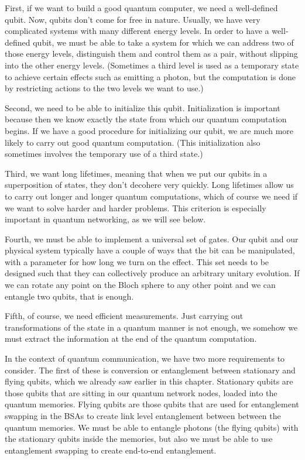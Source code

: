 First, if we want to build a good quantum computer, we need a well-defined qubit. Now, qubits don't come for free in nature. Usually, we have very complicated systems with many different energy levels. In order to have a well-defined qubit, we must be able to take a system for which we can address two of those energy levels, distinguish them and control them as a pair, without slipping into the other energy levels.  (Sometimes a third level is used as a temporary state to achieve certain effects such as emitting a photon, but the computation is done by restricting actions to the two levels we want to use.)

Second, we need to be able to initialize this qubit. Initialization is important because then we know exactly the state from which our quantum computation begins. If we have a good procedure for initializing our qubit, we are much more likely to carry out good quantum computation.  (This initialization also sometimes involves the temporary use of a third state.)

Third, we want long lifetimes, meaning that when we put our qubits in a superposition of states, they don't decohere very quickly. Long lifetimes allow us to carry out longer and longer quantum computations, which of course we need if we want to solve harder and harder problems.  This criterion is especially important in quantum networking, as we will see below.

Fourth, we must be able to implement a universal set of gates. Our qubit and our physical system typically have a couple of ways that the bit can be manipulated, with a parameter for how long we turn on the effect.  This set needs to be designed such that they can collectively produce an arbitrary unitary evolution. If we can rotate any point on the Bloch sphere to any other point and we can entangle two qubits, that is enough.

Fifth, of course, we need efficient measurements. Just carrying out transformations of the state in a quantum manner is not enough, we somehow we must extract the information at the end of the quantum computation.

In the context of quantum communication, we have two more requirements to consider. The first of these is conversion or entanglement between stationary and flying qubits, which we already saw earlier in this chapter. Stationary qubits are those qubits that are sitting in our quantum network nodes, loaded into the quantum memories.
Flying qubits are those qubits that are used for entanglement swapping in the BSAs to create link level entanglement between between the quantum memories. We must be able to entangle photons (the flying qubits) with the stationary qubits inside the memories, but also we must be able to use entanglement swapping to create end-to-end entanglement.


